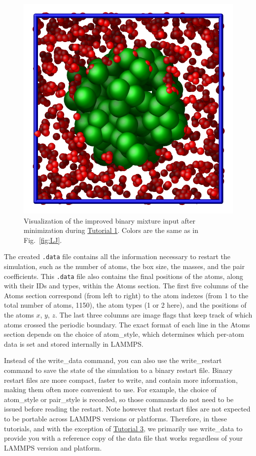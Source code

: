 \documentclass[9pt,tutorial]{livecoms}
\newcommand{\lmpcmd}[1]{\colorbox{listing}{\textcolor{command}{\small{#1}}}} %
\newcommand{\lmpcmdnote}[1]{\colorbox{note_listing}{\textcolor{command}{\small{#1}}}} %
\newcommand{\flecmd}[1]{\textcolor{command}{\texttt{#1}}} %
\begin{document}
\begin{figure}
\centering
\includegraphics[width=0.65\linewidth]{LJ-cylinder}
\caption{Visualization of the improved binary mixture input after minimization
  during \hyperref[lennard-jones-label]{Tutorial 1}.  Colors are the same as in
  Fig.~\ref{fig:LJ}.}
\label{fig:improved-min}
\end{figure}

The created \flecmd{.data} file contains all the information necessary
to restart the simulation, such as the number of atoms, the box size,
the masses, and the pair coefficients.  This \flecmd{.data} file also
contains the final positions of the atoms, along with their IDs and types,
within the \lmpcmd{Atoms} section.  The first five columns of the \lmpcmd{Atoms} section
correspond (from left to right) to the atom indexes (from 1 to the total
number of atoms, 1150), the atom types (1 or 2 here), and the positions
of the atoms $x$, $y$, $z$.  The last three columns are image flags that
keep track of which atoms crossed the periodic boundary.  The exact
format of each line in the \lmpcmd{Atoms} section depends on the choice
of \lmpcmd{atom\_style}, which determines which per-atom data is set and
stored internally in LAMMPS.

\begin{note}
  Instead of the \lmpcmdnote{write\_data} command, you can also use the
  \lmpcmdnote{write\_restart} command to save the state
  of the simulation to a binary restart file.  Binary restart files are
  more compact, faster to write, and contain more information, making them often
  more convenient to use.  For example, the choice of \lmpcmdnote{atom\_style}
  or \lmpcmdnote{pair\_style} is recorded, so those commands do not need to be issued
  before reading the restart.  Note however that restart files are not expected to be
  portable across LAMMPS versions or platforms.  Therefore, in these tutorials,
  and with the exception of \hyperref[all-atom-label]{Tutorial 3}, we primarily
  use \lmpcmdnote{write\_data} to provide you with a reference
  copy of the data file that works regardless of your LAMMPS version and platform.
\end{note}
\end{document}
